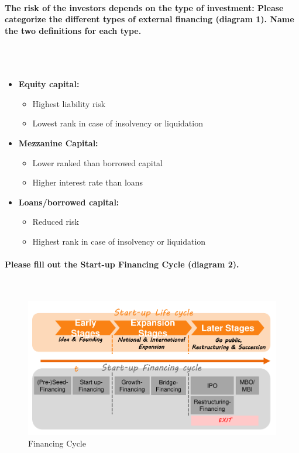 \documentclass[10pt,a4paper,noendnumber=true]{scrartcl}
\newcommand{\properparagraph}[1]{\paragraph{\textcolor{Emerald}{#1}}\mbox{}\\}
\begin{document}
\properparagraph{The risk of the investors depends on the type of investment: Please categorize the different types of external financing (diagram 1). Name the two	definitions for each type.}
\\[-6ex]
\begin{itemize}
	\item \textbf{Equity capital:}
	\begin{itemize}
		\item Highest liability risk
		\item Lowest rank in case of insolvency or liquidation
	\end{itemize}
	\item \textbf{Mezzanine Capital:}
	\begin{itemize}
		\item Lower ranked than borrowed capital
		\item Higher interest rate than loans
	\end{itemize}
	\item \textbf{Loans/borrowed capital:}
	\begin{itemize}
		\item Reduced risk
		\item Highest rank in case of insolvency or liquidation
	\end{itemize}
\end{itemize}


\properparagraph{Please fill out the Start-up Financing Cycle (diagram 2).}
\begin{figure}[H]
\centering
\includegraphics[width=0.7\linewidth]{img/financingcycle}
\caption{Financing Cycle}
\label{fig:financingcycle}
\end{figure}
\end{document}
